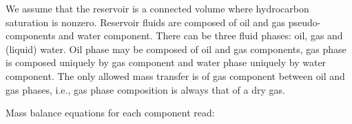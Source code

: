 \documentclass[final,authoryear,5p,times,twocolumn,10pt]{elsarticle}
\begin{document}



We assume that the reservoir is a connected volume where hydrocarbon saturation is nonzero. Reservoir fluids are composed of oil and gas pseudo-components and water component. There can be three fluid phases: oil, gas and (liquid) water. Oil phase may be composed of oil and gas components, gas phase is composed uniquely by gas component and water phase uniquely by water component. The only allowed mass transfer is of gas component between oil and gas phases, i.e., gas phase composition is always that of a dry gas.


Mass balance equations for each component read:
\end{document}
